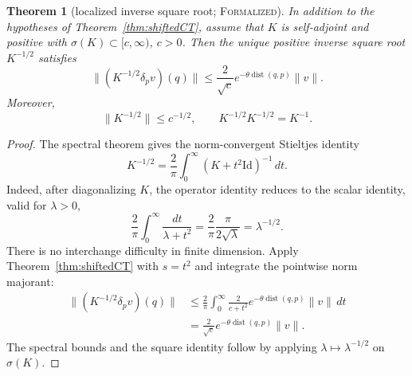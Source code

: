 \documentclass[11pt]{article}
\newtheorem{theorem}{Theorem}[section]
\theoremstyle{definition}
\newcommand{\Id}{\mathrm{Id}}
\newcommand{\dist}{\operatorname{dist}}
\newcommand{\norm}[1]{\lVert #1\rVert}
\newcommand{\formalized}{\textsc{Formalized}}
\begin{document}
\begin{theorem}[localized inverse square root; \formalized]\label{thm:root}
In addition to the hypotheses of Theorem~\ref{thm:shiftedCT}, assume that $K$
is self-adjoint and positive with
$\sigma(K)\subset[c,\infty)$, $c>0$.  Then the unique positive inverse square
root $K^{-1/2}$ satisfies
\begin{equation}\label{eq:rootbound}
  \norm{(K^{-1/2}\delta_pv)(q)}
  \le\frac{2}{\sqrt c}
      e^{-\theta\dist(q,p)}\norm v.
\end{equation}
Moreover,
\[
  \norm{K^{-1/2}}\le c^{-1/2},\qquad
  K^{-1/2}K^{-1/2}=K^{-1}.
\]
\end{theorem}

\begin{proof}
The spectral theorem gives the norm-convergent Stieltjes identity
\begin{equation}\label{eq:stieltjes}
  K^{-1/2}=\frac{2}{\pi}\int_0^\infty(K+t^2\Id)^{-1}\,dt.
\end{equation}
Indeed, after diagonalizing $K$, the operator identity reduces to the scalar
identity, valid for $\lambda>0$,
\begin{equation}\label{eq:scalar}
 \frac{2}{\pi}\int_0^\infty\frac{dt}{\lambda+t^2}
 =\frac{2}{\pi}\frac{\pi}{2\sqrt\lambda}
 =\lambda^{-1/2}.
\end{equation}
There is no interchange difficulty in finite dimension.  Apply
Theorem~\ref{thm:shiftedCT} with $s=t^2$ and integrate the pointwise norm
majorant:
\begin{align*}
 \norm{(K^{-1/2}\delta_pv)(q)}
 &\le \frac{2}{\pi}\int_0^\infty
       \frac{2}{c+t^2}e^{-\theta\dist(q,p)}\norm v\,dt\\
 &=\frac{2}{\sqrt c}e^{-\theta\dist(q,p)}\norm v.
\end{align*}
The spectral bounds and the square identity follow by applying
$\lambda\mapsto\lambda^{-1/2}$ on $\sigma(K)$.
\end{proof}
\end{document}
